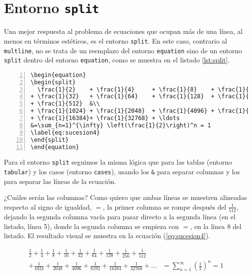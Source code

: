 \section{Entorno \texttt{split}}
\label{sec:entorno_split}



Una mejor respuesta al problema de ecuaciones que ocupan más de una línea, al menos en términos estéticos, es el entorno \texttt{split}. En este caso, contrario al \texttt{multline}, no se trata de un reemplazo del entorno \texttt{equation} sino de un entorno \texttt{split} dentro del entorno \texttt{equation}, como se muestra en el listado \ref{lst:split}.

\begin{lstlisting}[style=latex,numbers=left,caption={Sucesión en dos líneas, centradas.},label=lst:split]
\begin{equation}
\begin{split}
  \frac{1}{2}    + \frac{1}{4}     + \frac{1}{8}    + \frac{1}{16}
+ \frac{1}{32}   + \frac{1}{64}    + \frac{1}{128}  + \frac{1}{256}
+ \frac{1}{512}  &\\
+ \frac{1}{1024} + \frac{1}{2048}  + \frac{1}{4096} + \frac{1}{8192}
+ \frac{1}{16384}+ \frac{1}{32768} + \ldots
&=\sum_{n=1}^{\infty} \left(\frac{1}{2}\right)^n = 1
\label{eq:sucesion4}
\end{split}
\end{equation}
\end{lstlisting}

Para el entorno \texttt{split} seguimos la misma lógica que para las tablas (entorno \texttt{tabular}) y los casos (entorno \texttt{cases}), usando los \texttt{\&} para separar columnas y los \codigo{\textbackslash{}} para separar las líneas de la ecuación.

¿Cuáles serán las columnas? Como quiero que ambas líneas se muestren alineadas respecto al signo de igualdad, $=$, la primer columna se rompe después del $\frac{1}{512}$, dejando la segunda columna vacía para pasar directo a la segunda línea (en el listado, línea 5), donde la segunda columna se empieza con $=$, en la línea 8 del listado. El resultado visual se muestra en la ecuación (\ref{eq:sucesion4}).

\begin{equation}
\begin{split}
  \frac{1}{2}    + \frac{1}{4}     + \frac{1}{8}    + \frac{1}{16}
+ \frac{1}{32}   + \frac{1}{64}    + \frac{1}{128}  + \frac{1}{256}
+ \frac{1}{512}  &\\
+ \frac{1}{1024} + \frac{1}{2048}  + \frac{1}{4096} + \frac{1}{8192}
+ \frac{1}{16384}+ \frac{1}{32768} + \ldots
&=\sum_{n=1}^{\infty} \left(\frac{1}{2}\right)^n = 1
\label{eq:sucesion4}
\end{split}
\end{equation}



